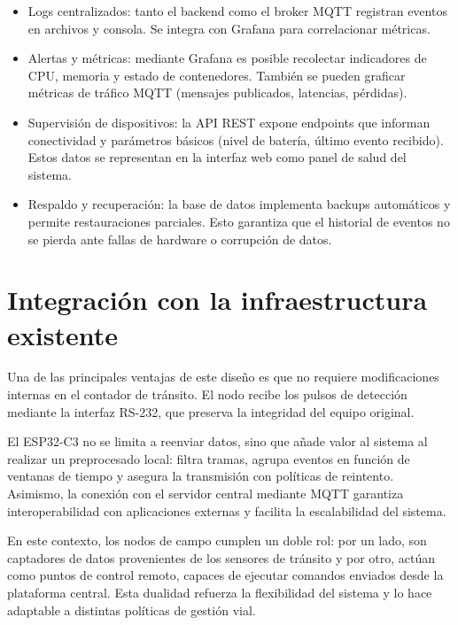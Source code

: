 \begin{itemize}
    \item Logs centralizados: tanto el backend como el broker MQTT registran eventos en archivos y consola. Se  integra con Grafana para correlacionar métricas.
    
    \item Alertas y métricas: mediante Grafana es posible recolectar indicadores de CPU, memoria y estado de contenedores. También se pueden graficar métricas de tráfico MQTT (mensajes publicados, latencias, pérdidas).
    
    \item Supervisión de dispositivos: la API REST expone endpoints que informan conectividad y parámetros básicos (nivel de batería, último evento recibido). Estos datos se representan en la interfaz web como panel de salud del sistema.
    
    \item Respaldo y recuperación: la base de datos implementa backups automáticos y permite restauraciones parciales. Esto garantiza que el historial de eventos no se pierda ante fallas de hardware o corrupción de datos.
\end{itemize}



\section{Integración con la infraestructura existente}
Una de las principales ventajas de este diseño es que no requiere modificaciones internas en el contador de tránsito. El nodo recibe los pulsos de detección mediante la interfaz RS-232, que preserva la integridad del equipo original. 

El ESP32-C3 no se limita a reenviar datos, sino que añade valor al sistema al realizar un preprocesado local: filtra tramas, agrupa eventos en función de ventanas de tiempo y asegura la transmisión con políticas de reintento. Asimismo, la conexión con el servidor central mediante MQTT garantiza interoperabilidad con aplicaciones externas y facilita la escalabilidad del sistema.

En este contexto, los nodos de campo cumplen un doble rol: por un lado, son captadores de datos provenientes de los sensores de tránsito y por otro, actúan como puntos de control remoto, capaces de ejecutar comandos enviados desde la plataforma central. Esta dualidad refuerza la flexibilidad del sistema y lo hace adaptable a distintas políticas de gestión vial.




